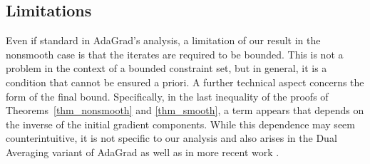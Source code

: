 \documentclass[11pt]{article}
\theoremstyle{plain}
\theoremstyle{definition}
\theoremstyle{remark}
\newcommand{\bx}{\bm{x}}
\newcommand{\iter}{n}
\newcommand{\ite}{k}
\newcommand{\reg}{\varphi}
\begin{document}

\subsection{Limitations}
Even if standard in AdaGrad's analysis, a limitation of our result in the nonsmooth case is that the iterates are required to be bounded. This is not a problem in the context of a bounded constraint set, but in general, it is a condition that cannot be ensured a priori.
 A further technical aspect concerns the form of the final bound. Specifically, in the last inequality of the proofs of Theorems~\ref{thm_nonsmooth} and  \ref{thm_smooth}, a term appears that depends on the inverse of the initial gradient components. While this dependence may seem counterintuitive, it is not specific to our analysis and also arises in the Dual Averaging variant of AdaGrad \cite{duchi2011adaptive} as well as in more recent work \cite{defazio2023learning}. 


\end{document}
